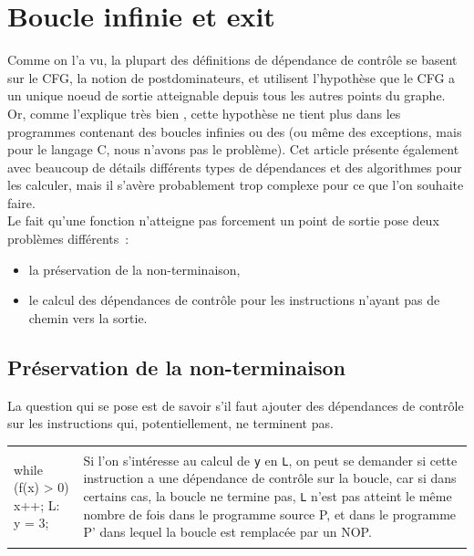 \section{Boucle infinie et exit}

Comme on l'a vu,
la plupart des définitions de dépendance de contrôle se basent
sur le CFG, la notion de postdominateurs, et utilisent l'hypothèse
que le CFG a un unique noeud de sortie \nE{} atteignable depuis tous les
autres points du graphe. Or, comme l'explique très bien \cite{ranganath04new},
cette hypothèse ne tient plus dans les programmes contenant
des boucles infinies ou des  (ou même des exceptions,
mais pour le langage C, nous n'avons pas le problème).
Cet article présente également avec beaucoup de détails
différents types de dépendances et des algorithmes pour les calculer,
mais il s'avère probablement trop complexe pour ce que l'on souhaite faire.\\

Le fait qu'une fonction n'atteigne pas forcement un point de sortie pose deux
problèmes différents~:
\begin{itemize}
  \item la préservation de la non-terminaison,
  \item le calcul des dépendances de contrôle pour les instructions
    n'ayant pas de chemin vers la sortie.
\end{itemize}

\subsection{Préservation de la non-terminaison}

La question qui se pose est de savoir s'il faut ajouter des dépendances de
contrôle sur les instructions qui, potentiellement, ne terminent pas.

\begin{exemple}
    \begin{tabular}{p{5.5cm}p{\dimexpr\linewidth-6.5cm}}
\begin{clisting}
while (f(x) > 0) x++;
L: y = 3;
\end{clisting}
&
Si l'on s'intéresse au calcul de {\tt y} en {\tt L}, on peut se demander si
cette instruction a une dépendance de contrôle sur la boucle,
car si dans certains cas, la boucle ne termine pas,
{\tt L} n'est pas atteint le même nombre de fois
dans le programme source P, et dans le programme P' dans lequel la boucle est
remplacée par un NOP.

\end{tabular}
\end{exemple}

